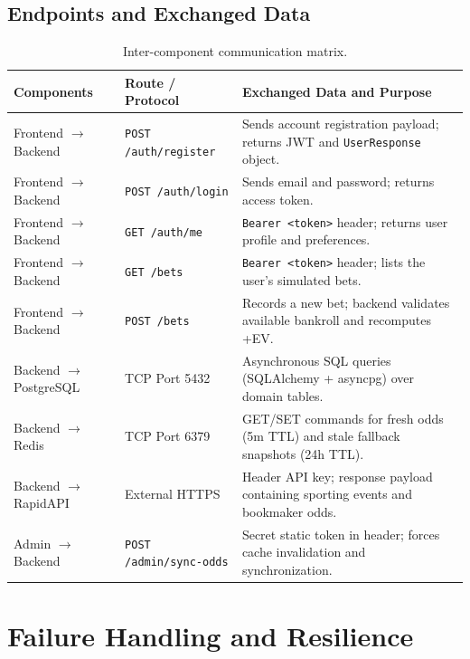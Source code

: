\documentclass[11pt,a4paper]{article}
\begin{document}
\subsection{Endpoints and Exchanged Data}

\begin{table}[h!]
\centering
\footnotesize
\begin{tabular}{p{3.8cm} p{3.2cm} p{7.5cm}}
\toprule
\textbf{Components} & \textbf{Route / Protocol} & \textbf{Exchanged Data and Purpose} \\
\midrule
Frontend $\rightarrow$ Backend & \texttt{POST /auth/register} & Sends account registration payload; returns JWT and \texttt{UserResponse} object. \\
Frontend $\rightarrow$ Backend & \texttt{POST /auth/login} & Sends email and password; returns access token. \\
Frontend $\rightarrow$ Backend & \texttt{GET /auth/me} & \texttt{Bearer <token>} header; returns user profile and preferences. \\
Frontend $\rightarrow$ Backend & \texttt{GET /bets} & \texttt{Bearer <token>} header; lists the user's simulated bets. \\
Frontend $\rightarrow$ Backend & \texttt{POST /bets} & Records a new bet; backend validates available bankroll and recomputes +EV. \\
Backend $\rightarrow$ PostgreSQL & TCP Port 5432 & Asynchronous SQL queries (SQLAlchemy + asyncpg) over domain tables. \\
Backend $\rightarrow$ Redis & TCP Port 6379 & GET/SET commands for fresh odds (5m TTL) and stale fallback snapshots (24h TTL). \\
Backend $\rightarrow$ RapidAPI & External HTTPS & Header API key; response payload containing sporting events and bookmaker odds. \\
Admin $\rightarrow$ Backend & \texttt{POST /admin/sync-odds} & Secret static token in header; forces cache invalidation and synchronization. \\
\bottomrule
\end{tabular}
\caption{Inter-component communication matrix.}
\end{table}

\section{Failure Handling and Resilience}
\end{document}
